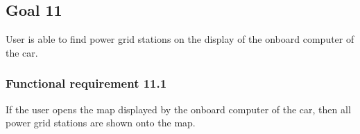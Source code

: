 \subsection{Goal 11}
User is able to find power grid stations on the display of the onboard computer of the car.

\setcounter{secnumdepth}{3}
\subsubsection{Functional requirement 11.1}
If the user opens the map displayed by the onboard computer of the car, then all power grid stations are shown onto the map.